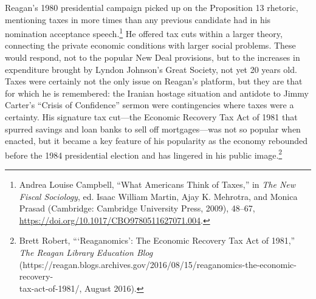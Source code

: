 \documentclass[12pt,oneside]{psthesis}
\begin{document}
Reagan's 1980 presidential campaign picked up on the Proposition 13 rhetoric, mentioning taxes in more times than any previous candidate had in his nomination acceptance speech.\footnote{Andrea Louise Campbell, ``What Americans Think of Taxes,'' in \emph{The New Fiscal Sociology}, ed. Isaac William Martin, Ajay K. Mehrotra, and Monica Prasad (Cambridge: Cambridge University Press, 2009), 48--67, \url{https://doi.org/10.1017/CBO9780511627071.004}.}
He offered tax cuts within a larger theory, connecting the private economic conditions with larger social problems.
These would respond, not to the popular New Deal provisions, but to the increases in expenditure brought by Lyndon Johnson's Great Society, not yet 20 years old.
Taxes were certainly not the only issue on Reagan's platform, but they are that for which he is remembered: the Iranian hostage situation and antidote to Jimmy Carter's ``Crisis of Confidence'' sermon were contingencies where taxes were a certainty.
His signature tax cut---the Economic Recovery Tax Act of 1981 that spurred savings and loan banks to sell off mortgages---was not so popular when enacted, but it became a key feature of his popularity as the economy rebounded before the 1984 presidential election and has lingered in his public image.\footnote{Brett Robert, ```Reaganomics': The Economic Recovery Tax Act of 1981,'' \emph{The Reagan Library Education Blog} (https://reagan.blogs.archives.gov/2016/08/15/reaganomics-the-economic-recovery-\\tax-act-of-1981/, August 2016).}
\end{document}

